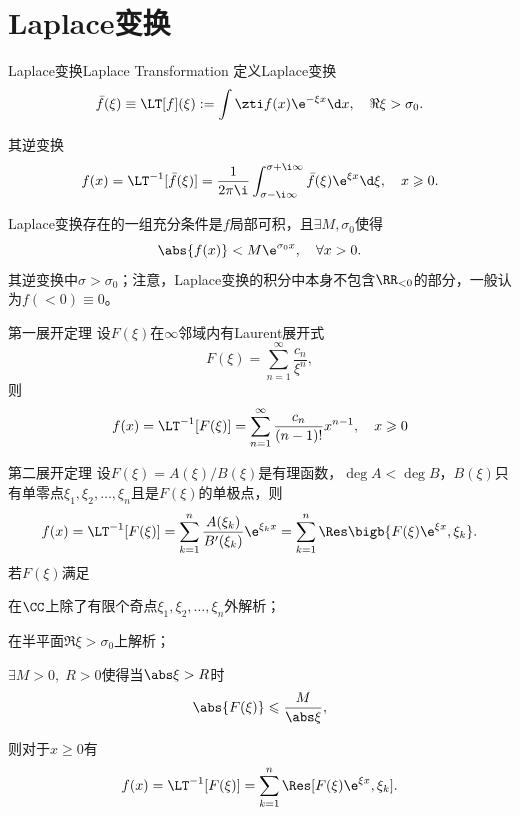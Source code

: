 \section{Laplace变换}
\begin{definition}{Laplace变换}{Laplace Transformation}
	定义Laplace变换
	\[
		\bar f(\xi)\equiv\LT[f](\xi):=\int\zti f(x)\e^{-\xi x}\d x,\quad\Re\xi>\sigma_0.
	\]
	
	其逆变换
	\[
		f(x)=\LT^{-1}[\bar f(\xi)] = \frac1{2\pi\i}\int_{\sigma-\i\infty}^{\sigma+\i\infty}\bar f(\xi)\e^{\xi x}\d\xi,\quad x\geqslant 0.
	\]
\end{definition}
Laplace变换存在的一组充分条件是$f$局部可积，且$\exists M,\sigma_0$使得
	\[
		\abs{f(x)}<M\e^{\sigma_0x},\quad\forall x>0.
	\]
其逆变换中$\sigma>\sigma_0$；注意，Laplace变换的积分中本身不包含$\RR_{<0}$的部分，一般认为$f(<0)\equiv 0$。
\begin{theorem}{第一展开定理}{}
	设$F(\xi)$在$\infty$邻域内有Laurent展开式
	\[
		F(\xi)=\sum_{n=1}^\infty\frac{c_n}{\xi^n},
	\]
	则
	\[
		f(x)=\LT^{-1}[F(\xi)] = \sum_{n=1}^\infty\frac{c_n}{(n-1)!}x^{n-1},\quad x\geqslant 0
	\]
\end{theorem}
\begin{theorem}{第二展开定理}{}
	设$F(\xi)=A(\xi)/B(\xi)$是有理函数，$\deg A<\deg B$，$B(\xi)$只有单零点$\xi_1,\xi_2,\ldots,\xi_n$且是$F(\xi)$的单极点，则
	\[
		f(x)=\LT^{-1}[F(\xi)] = \sum_{k=1}^n\frac{A(\xi_k)}{B'(\xi_k)}\e^{\xi_kx}=\sum_{k=1}^n\Res\bigb{F(\xi)\e^{\xi x},\xi_k}.
	\]
\tcblower
	若$F(\xi)$满足
	\begin{compactenum}
		\item 在$\CC$上除了有限个奇点$\xi_1,\xi_2,\ldots,\xi_n$外解析；
		\item 在半平面$\Re\xi>\sigma_0$上解析；
		\item $\exists M>0,\;R>0$使得当$\abs\xi>R$时
		\[
			\abs{F(\xi)}\leqslant\frac M{\abs\xi},
		\]
	\end{compactenum}
	则对于$x\geqslant 0$有
	\[
		f(x)=\LT^{-1}[F(\xi)] = \sum_{k=1}^n\Res[F(\xi)\e^{\xi x},\xi_k].
	\]
\end{theorem}
